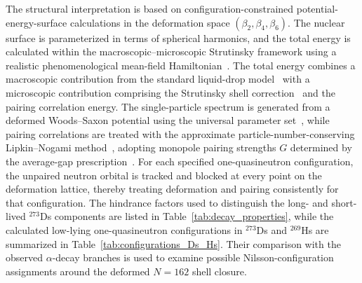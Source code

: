 \documentclass[11pt]{article}
\begin{document}
The structural interpretation is based on configuration-constrained potential-energy-surface calculations in the deformation space $(\beta_2,\beta_4,\beta_6)$. 
The nuclear surface is parameterized in terms of spherical harmonics, and the total energy is calculated within the macroscopic--microscopic Strutinsky framework using a realistic phenomenological mean-field Hamiltonian~\cite{brack1972FunnyHillsShellCorrection,xu1998MultiquasiparticlePotentialenergySurfaces,meng2022LandscapeAppreciationSystematic}.
The total energy combines a macroscopic contribution from the standard liquid-drop model~\cite{myersNUCLEARMASSESDEFORMATIONS} with a microscopic contribution comprising the Strutinsky shell correction~\cite{strutinsky1967ShellEffectsNuclear} and the pairing correlation energy. 
The single-particle spectrum is generated from a deformed Woods--Saxon potential using the universal parameter set~\cite{CWIOK1987379}, while pairing correlations are treated with the approximate particle-number-conserving Lipkin--Nogami method~\cite{PRADHAN1973357}, adopting monopole pairing strengths $G$ determined by the average-gap prescription~\cite{MOLLER199220}. 
For each specified one-quasineutron configuration, the unpaired neutron orbital is tracked and blocked at every point on the deformation lattice, thereby treating deformation and pairing consistently for that configuration. 
The hindrance factors used to distinguish the long- and short-lived $^{273}$Ds components are listed in Table~\ref{tab:decay_properties}, while the calculated low-lying one-quasineutron configurations in $^{273}$Ds and $^{269}$Hs are summarized in Table~\ref{tab:configurations_Ds_Hs}. Their comparison with the observed $\alpha$-decay branches is used to examine possible Nilsson-configuration assignments around the deformed $N=162$ shell closure.
\end{document}

